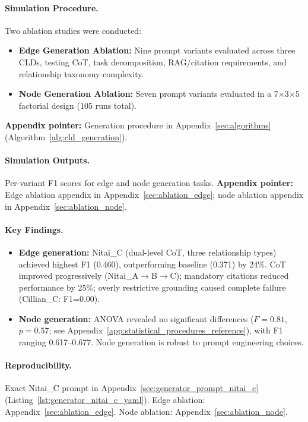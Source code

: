 \paragraph{Simulation Procedure.}
Two ablation studies were conducted:
\begin{itemize}[noitemsep]
    \item \textbf{Edge Generation Ablation:} Nine prompt variants evaluated across three CLDs, testing CoT, task decomposition, RAG/citation requirements, and relationship taxonomy complexity.
    \item \textbf{Node Generation Ablation:} Seven prompt variants evaluated in a 7$\times$3$\times$5 factorial design (105 runs total).
\end{itemize}
\textbf{Appendix pointer:} Generation procedure in Appendix~\ref{sec:algorithms} (Algorithm~\ref{alg:cld_generation}).

\paragraph{Simulation Outputs.}
Per-variant F1 scores for edge and node generation tasks.
\textbf{Appendix pointer:} Edge ablation appendix in Appendix~\ref{sec:ablation_edge}; node ablation appendix in Appendix~\ref{sec:ablation_node}.

\paragraph{Key Findings.}
\begin{itemize}[noitemsep]
    \item \textbf{Edge generation:} Nitai\_C (dual-level CoT, three relationship types) achieved highest F1 (0.460), outperforming baseline (0.371) by 24\%. CoT improved progressively (Nitai\_A$\rightarrow$B$\rightarrow$C); mandatory citations reduced performance by 25\%; overly restrictive grounding caused complete failure (Cillian\_C: F1=0.00).
    \item \textbf{Node generation:} ANOVA revealed no significant differences ($F=0.81$, $p=0.57$; see Appendix~\ref{app:statistical_procedures_reference}), with F1 ranging 0.617--0.677. Node generation is robust to prompt engineering choices.
\end{itemize}

\paragraph{Reproducibility.}
Exact Nitai\_C prompt in Appendix~\ref{sec:generator_prompt_nitai_c} (Listing~\ref{lst:generator_nitai_c_yaml}). Edge ablation: Appendix~\ref{sec:ablation_edge}. Node ablation: Appendix~\ref{sec:ablation_node}.

